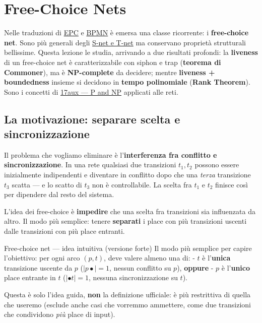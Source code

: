 \chapter{\texorpdfstring{Free-Choice Nets}{Free-Choice Nets}}
\label{ch:17}

Nelle traduzioni di \hyperref[ch:16a]{EPC} e \hyperref[ch:16b]{BPMN} è emersa una classe ricorrente: i \textbf{free-choice net}. Sono più generali degli \hyperref[ch:15]{S-net e T-net} ma conservano proprietà strutturali bellissime. Questa lezione le studia, arrivando a due risultati profondi: la \textbf{liveness} di un free-choice net è caratterizzabile con siphon e trap (\textbf{teorema di Commoner}), ma è \textbf{NP-complete} da decidere; mentre \textbf{liveness + boundedness} insieme si decidono in \textbf{tempo polinomiale} (\textbf{Rank Theorem}). Sono i concetti di \hyperref[ch:17aux]{17aux — P and NP} applicati alle reti.

\section{\texorpdfstring{La motivazione: separare scelta e sincronizzazione}{La motivazione: separare scelta e sincronizzazione}}

Il problema che vogliamo eliminare è l'\textbf{interferenza fra conflitto e sincronizzazione}. In una rete qualsiasi due transizioni $t_1, t_2$ possono essere inizialmente indipendenti e diventare in conflitto dopo che una \emph{terza} transizione $t_3$ scatta — e lo scatto di $t_3$ non è controllabile. La scelta fra $t_1$ e $t_2$ finisce così per dipendere dal resto del sistema.

L'idea dei free-choice è \textbf{impedire} che una scelta fra transizioni sia influenzata da altro. Il modo più semplice: tenere \textbf{separati} i place con più transizioni uscenti dalle transizioni con più place entranti.

\begin{boxdefinition}{Free-choice net — idea intuitiva (versione forte)}
Il modo più semplice per capire l'obiettivo: per ogni arco $(p,t)$, deve valere almeno una di: - $t$ è l'\textbf{unica} transizione uscente da $p$ ($|p\bullet| = 1$, nessun conflitto su $p$), \textbf{oppure} - $p$ è l'\textbf{unico} place entrante in $t$ ($|\bullet t| = 1$, nessuna sincronizzazione su $t$).

Questa è solo l'idea guida, \textbf{non} la definizione ufficiale: è più restrittiva di quella che useremo (esclude anche casi che vorremmo ammettere, come due transizioni che condividono \emph{più} place di input).
\end{boxdefinition}

